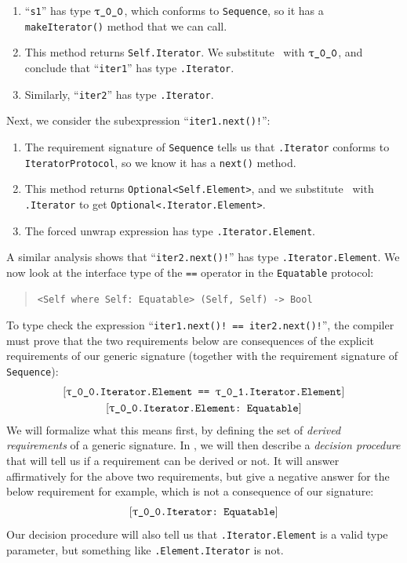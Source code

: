 \documentclass[../generics]{subfiles}
\begin{document}
\begin{example}
\begin{enumerate}
\item ``\texttt{s1}'' has type $\rT$, which conforms to \texttt{Sequence}, so it has a \texttt{makeIterator()} method that we can call.
\item This method returns \texttt{Self.Iterator}. We substitute \tSelf\ with $\rT$, and conclude that ``\texttt{iter1}'' has type \texttt{\rT.Iterator}.
\item Similarly, ``\texttt{iter2}'' has type \texttt{\rU.Iterator}.
\end{enumerate}
Next, we consider the subexpression ``\verb|iter1.next()!|'':
\begin{enumerate}
\item The requirement signature of \texttt{Sequence} tells us that \texttt{\rT.Iterator} conforms to \texttt{IteratorProtocol}, so we know it has a \texttt{next()} method.
\item This method returns \texttt{Optional<Self.Element>}, and we substitute \tSelf\ with \texttt{\rT.Iterator} to get \texttt{Optional<\rT.Iterator.Element>}.
\item The forced unwrap expression has type \texttt{\rT.Iterator.Element}.
\end{enumerate}
A similar analysis shows that ``\verb|iter2.next()!|'' has type \texttt{\rU.Iterator.Element}. We now look at the interface type of the \texttt{==} operator in the \texttt{Equatable} protocol:
\begin{quote}
\begin{verbatim}
<Self where Self: Equatable> (Self, Self) -> Bool
\end{verbatim}
\end{quote}
To type check the expression ``\verb|iter1.next()! == iter2.next()!|'', the compiler must prove that the two requirements below are consequences of the explicit requirements of our generic signature (together with the requirement signature of \texttt{Sequence}):
\begin{gather*}
\SameReq{\rT.Iterator.Element}{\rU.Iterator.Element}\\
\ConfReq{\rT.Iterator.Element}{Equatable}
\end{gather*}
We will formalize what this means first, by defining the set of \emph{derived requirements} of a generic signature. In , we will then describe a \emph{decision procedure} that will tell us if a requirement can be derived or not. It will answer affirmatively for the above two requirements, but give a negative answer for the below requirement for example, which is not a consequence of our signature:
\begin{gather*}
\ConfReq{\rT.Iterator}{Equatable}
\end{gather*}
Our decision procedure will also tell us that \texttt{\rT.Iterator.Element} is a valid type parameter, but something like \texttt{\rT.Element.Iterator} is not.
\end{example}
\end{document}
